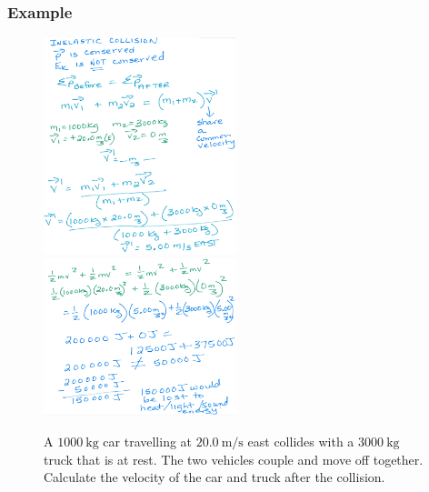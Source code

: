 \documentclass[a4paper,12pt]{article}
\begin{document}
\subsubsection{Example}
\begin{figure}[H]
    \centering
    \caption{A $\SI{1000}{\kg}$ car travelling at $\SI{20.0}{\m/\s}$ east collides with a $\SI{3000}{\kg}$ truck that is at rest. The two vehicles couple and move off together. Calculate the velocity of the car and truck after the collision.}
    \includegraphics[width=0.5\textwidth]{q-inelastic-1}
    \includegraphics[width=0.5\textwidth]{q-inelastic-1b}
\end{figure}
\end{document}
